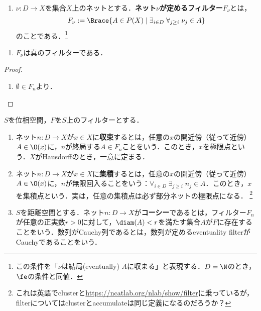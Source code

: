 \documentclass[uplatex,dvipdfmx]{jsreport}
\begin{document}
\begin{definition}\mbox{}
    \begin{enumerate}
        \item $\nu:D\to X$を集合$X$上のネットとする．\textbf{ネット$\nu$が定めるフィルター}$F_\nu$とは，
        \[F_\nu:=\Brace{A\in P(X)\mid \exists_{i\in D}\;\forall_{j\ge i}\;\nu_j\in A}\]
        のことである．\footnote{この条件を「$\nu$は結局(eventually) $A$に収まる」と表現する．$D=\N$のとき，$\fe$の条件と同値．}
    \end{enumerate}
\end{definition}

\begin{lemma}\mbox{}
    \begin{enumerate}
        \item $F_\nu$は真のフィルターである．
    \end{enumerate}
\end{lemma}
\begin{proof}\mbox{}
    \begin{enumerate}
        \item $\emptyset\in F_n$より．
    \end{enumerate}
\end{proof}

\begin{definition}
    $S$を位相空間，$F$を$S$上のフィルターとする．
    \begin{enumerate}
        \item ネット$n:D\to X$が$x\in X$に\textbf{収束}するとは，任意の$x$の開近傍（従って近傍）$A\in\O(x)$に，$n$が終局する$A\in F_n$ことをいう．このとき，$x$を極限点という．$X$がHausdorffのとき，一意に定まる．
        \item ネット$n:D\to X$が$x\in X$に\textbf{集積}するとは，任意の$x$の開近傍（従って近傍）$A\in\O(x)$に，$n$が無限回入ることをいう：$\forall_{i\in D}\;\exists_{j\ge i}\;n_j\in A$．このとき，$x$を集積点という．実は，任意の集積点は必ず部分ネットの極限点になる．
        \footnote{これは英語でclusterと\url{https://ncatlab.org/nlab/show/filter}に乗っているが，filterについてはclusterとaccumulateは同じ定義になるのだろうか？}
        \item $S$を距離空間とする．ネット$n:D\to X$が\textbf{コーシー}であるとは，フィルター$F_n$が任意の正実数$r>0$に対して，$\diam(A)<r$を満たす集合$A$が$F$に存在することをいう．数列がCauchy列であるとは，数列が定めるeventuality filterがCauchyであることをいう．
    \end{enumerate}
\end{definition}
\end{document}

